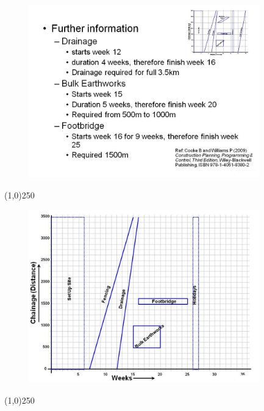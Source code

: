 \begin{frame}
\begin{figure}
	\centering
		\includegraphics[width = 10.0cm]{oldnotes/Slide307.jpg}
\end{figure}
\end{frame}
\begin{center}\line(1,0){250}\end{center}




\begin{frame}
\begin{figure}
	\centering
		\includegraphics[width = 10.0cm]{oldnotes/Slide308.jpg}
\end{figure}
\end{frame}
\begin{center}\line(1,0){250}\end{center}




